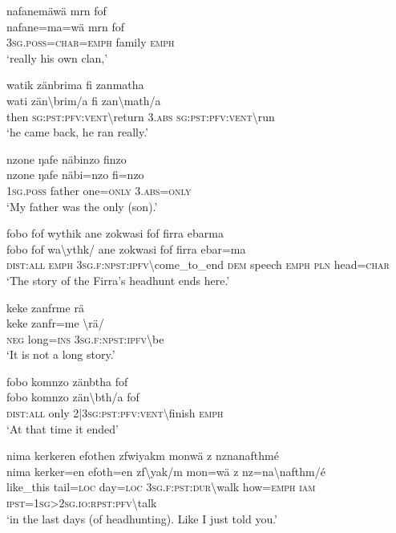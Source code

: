\ea\label{ex:4:a1816}
nafanemäwä mrn fof\\
\gll nafane=ma=wä	mrn	fof\\
     3\textsc{sg}.\textsc{poss}=\textsc{char}=\textsc{emph}	family	\textsc{emph}\\
\glt `really his own clan,'
\z

\ea\label{ex:4:a1817}
watik zänbrima fi zanmatha\\
\gll wati	zän{\textbackslash}brim/a	fi	zan{\textbackslash}math/a\\
     then	\textsc{sg}:\textsc{pst}:\textsc{pfv}:\textsc{vent}{\textbackslash}return	3.\textsc{abs}	\textsc{sg}:\textsc{pst}:\textsc{pfv}:\textsc{vent}{\textbackslash}run\\
\glt `he came back, he ran really.'
\z

\ea\label{ex:4:a1818}
nzone ŋafe näbinzo finzo\\
\gll nzone	ŋafe	näbi=nzo	fi=nzo\\
     1\textsc{sg}.\textsc{poss}	father	one=\textsc{only}	3.\textsc{abs}=\textsc{only}\\
\glt `My father was the only (son).'
\z

\ea\label{ex:4:a1819}
fobo fof wythik ane zokwasi fof firra ebarma\\
\gll fobo	fof	wa{\textbackslash}ythk/	ane	zokwasi	fof	firra	ebar=ma\\
     \textsc{dist}:\textsc{all}	\textsc{emph}	3\textsc{sg}.\textsc{f}:\textsc{npst}:\textsc{ipfv}{\textbackslash}come\_to\_end	\textsc{dem}	speech	\textsc{emph}	\textsc{pln}	head=\textsc{char}\\
\glt `The story of the Firra's headhunt ends here.'
\z

\ea\label{ex:4:a1820}
keke zanfrme rä\\
\gll keke	zanfr=me	{\textbackslash}rä/\\
     \textsc{neg}	long=\textsc{ins}	3\textsc{sg}.\textsc{f}:\textsc{npst}:\textsc{ipfv}{\textbackslash}be\\
\glt `It is not a long story.'
\z

\ea\label{ex:4:a1821}
fobo komnzo zänbtha fof\\
\gll fobo	komnzo	zän{\textbackslash}bth/a	fof\\
     \textsc{dist}:\textsc{all}	only	2|3\textsc{sg}:\textsc{pst}:\textsc{pfv}:\textsc{vent}{\textbackslash}finish	\textsc{emph}\\
\glt `At that time it ended'
\z

\ea\label{ex:4:a1822}
nima kerkeren efothen zfwiyakm monwä z nznanafthmé\\
\gll nima	kerker=en	efoth=en	zf{\textbackslash}yak/m	mon=wä	z	nz=na{\textbackslash}nafthm/é\\
     like\_this	tail=\textsc{loc}	day=\textsc{loc}	3\textsc{sg}.\textsc{f}:\textsc{pst}:\textsc{dur}{\textbackslash}walk	how=\textsc{emph}	\textsc{iam}	\textsc{ipst}=1\textsc{sg}>2\textsc{sg}.\textsc{io}:\textsc{rpst}:\textsc{pfv}{\textbackslash}talk\\
\glt `in the last days (of headhunting). Like I just told you.'
\z


